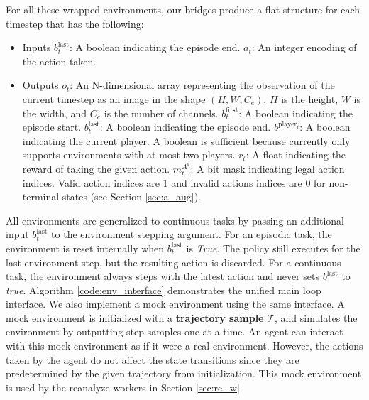 For all these wrapped environments, our bridges produce a flat structure for each timestep that has the following:
\begin{itemize}
    \item Inputs
          \subitem $b^{\text{last}}_{t}$: A boolean indicating the episode end.
          \subitem $a_t$: An integer encoding of the action taken.
    \item Outputs
          \subitem $o_t$:
          An N-dimensional array representing the observation of the current timestep as an image
          in the shape $(H, W, C_e)$. $H$ is the height, $W$ is the width, and $C_e$ is the number of channels.
          \subitem $b^{\text{first}}_{t}$: A boolean indicating the episode start.
          \subitem $b^{\text{last}}_{t}$: A boolean indicating the episode end.
          \subitem $b^{\text{player}_{t}}$: A boolean indicating the current player. A boolean is sufficient because \moozi currently only supports environments with at most two players.
          \subitem $r_t$: A float indicating the reward of taking the given action.
          \subitem $m^{A^a}_t$: A bit mask indicating legal action indices. Valid
          action indices are $1$ and invalid actions indices are $0$ for non-terminal states (see Section \ref{sec:a_aug}).
\end{itemize}

All environments are generalized to continuous tasks by passing an additional input $b^\text{last}_t$ to the environment stepping argument.
For an episodic task, the environment is reset internally when $b^{\text{last}}_t$ is \textit{True}.
The policy still executes for the last environment step, but the resulting action is discarded.
For a continuous task, the environment always steps with the latest action and never sets $b^\text{last}$ to \textit{true}.
Algorithm \ref{code:env_interface} demonstrates the unified main loop interface.
We also implement a mock environment \cite{MockObject__2021} using the same interface.
A mock environment is initialized with a \textbf{trajectory sample} $\mathcal{T}$, and simulates the environment by outputting step samples one at a time.
An agent can interact with this mock environment as if it were a real environment.
However, the actions taken by the agent do not affect the state transitions since they are predetermined by the given trajectory from initialization.
This mock environment is used by the reanalyze workers in Section \ref{sec:re_w}.



